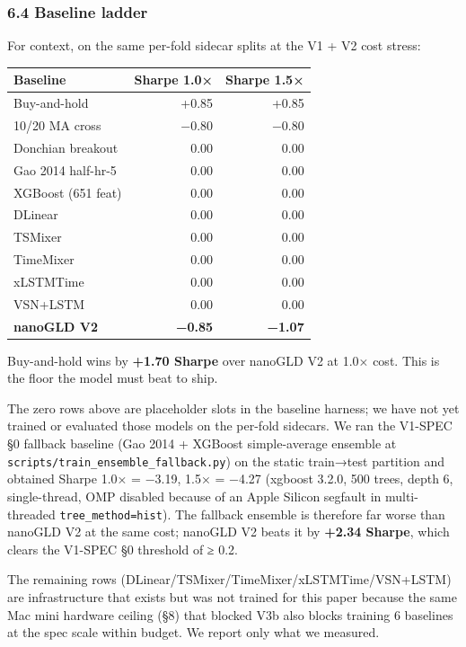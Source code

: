 \documentclass[
]{article}
\newcounter{none} %
\begin{document}
\subsubsection{6.4 Baseline ladder}\label{baseline-ladder}

For context, on the same per-fold sidecar splits at the V1 + V2 cost
stress:

{\def\LTcaptype{none} %
\begin{longtable}[]{@{}lrr@{}}
\toprule\noalign{}
Baseline & Sharpe 1.0× & Sharpe 1.5× \\
\midrule\noalign{}
\endhead
\bottomrule\noalign{}
\endlastfoot
Buy-and-hold & +0.85 & +0.85 \\
10/20 MA cross & −0.80 & −0.80 \\
Donchian breakout & 0.00 & 0.00 \\
Gao 2014 half-hr-5 & 0.00 & 0.00 \\
XGBoost (651 feat) & 0.00 & 0.00 \\
DLinear & 0.00 & 0.00 \\
TSMixer & 0.00 & 0.00 \\
TimeMixer & 0.00 & 0.00 \\
xLSTMTime & 0.00 & 0.00 \\
VSN+LSTM & 0.00 & 0.00 \\
\textbf{nanoGLD V2} & \textbf{−0.85} & \textbf{−1.07} \\
\end{longtable}
}

Buy-and-hold wins by \textbf{+1.70 Sharpe} over nanoGLD V2 at 1.0× cost.
This is the floor the model must beat to ship.

The zero rows above are placeholder slots in the baseline harness; we
have not yet trained or evaluated those models on the per-fold sidecars.
We ran the V1-SPEC §0 fallback baseline (Gao 2014 + XGBoost
simple-average ensemble at
\texttt{scripts/train\_ensemble\_fallback.py}) on the static train→test
partition and obtained Sharpe 1.0× = −3.19, 1.5× = −4.27 (xgboost 3.2.0,
500 trees, depth 6, single-thread, OMP disabled because of an Apple
Silicon segfault in multi-threaded \texttt{tree\_method=hist}). The
fallback ensemble is therefore far worse than nanoGLD V2 at the same
cost; nanoGLD V2 beats it by \textbf{+2.34 Sharpe}, which clears the
V1-SPEC §0 threshold of ≥ 0.2.

The remaining rows (DLinear/TSMixer/TimeMixer/xLSTMTime/VSN+LSTM) are
infrastructure that exists but was not trained for this paper because
the same Mac mini hardware ceiling (§8) that blocked V3b also blocks
training 6 baselines at the spec scale within budget. We report only
what we measured.
\end{document}
